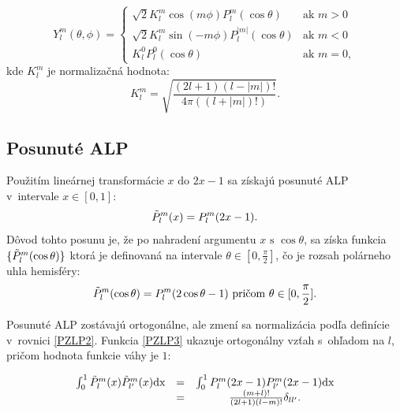 \begin{equation} \label{ZLP2}
    Y^m_l(\theta, \phi) = 
    \begin{cases}
        \sqrt{2}K^m_l\cos(m\phi)P^m_l(\cos\theta) & \text{ak } m > 0 \\
        \sqrt{2}K^m_l\sin(-m\phi)P^{|m|}_l(\cos\theta) & \text{ak } m < 0 \\
        K^0_lP^0_l(\cos\theta) & \text{ak } m = 0,
    \end{cases}
\end{equation}
kde $K_l^m$ je normalizačná hodnota:
\begin{equation} \label{ZLP3}
    K_l^m = \sqrt{\frac{(2l+1)(l-| m |)!}{4\pi((l+|m|)!)}}.
\end{equation}
\subsection*{Posunuté ALP}
\label{ShiftedALP}
Použitím lineárnej transformácie $x \text{ do } 2x-1$ sa získajú posunuté ALP \cite{HSH} v~intervale $x \in [0,1]$:
\begin{equation} \label{PZLP}
    \Tilde{P}_l^m(x) = P^m_l(2x-1).
\end{equation}
Dôvod tohto posunu je, že po nahradení argumentu $x \text{ s } \cos\theta$, sa získa funkcia $\{\Tilde{P}^m_l(\cos\theta)\}$ ktorá je definovaná na intervale $\theta \in [0, \frac{\pi}{2}]$, čo je rozsah polárneho uhla hemisféry:
\begin{equation} \label{PZLP2}
    \Tilde{P}_l^m(\cos\theta) = P^m_l(2\cos\theta-1) \text{ pričom } \theta \in [0, \frac{\pi}{2}].
\end{equation}

Posunuté ALP zostávajú ortogonálne, ale zmení sa normalizácia podľa definície v~rovnici \ref{PZLP2}. Funkcia \ref{PZLP3} ukazuje ortogonálny vzťah s~ohľadom na $l$, pričom hodnota funkcie váhy je $1$:

\begin{equation} \label{PZLP3}
    \begin{array}{ccc}
     \int_0^1\Tilde{P}_l^m(x)\Tilde{P}_{l'}^m(x) \text{dx} & = & \int_0^1 P_l^m(2x-1)P_{l'}^m(2x-1)\text{dx} \\
         & = & \frac{(m+l)!}{(2l+1)(l-m)!}\delta_{ll'}.
    \end{array}
\end{equation}

